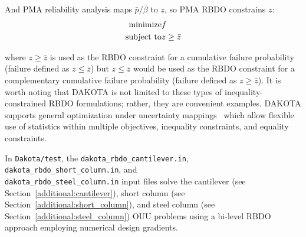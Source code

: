 \noindent And PMA reliability analysis maps $\bar{p}/\bar{\beta}$ to 
$z$, so PMA RBDO constrains $z$:
\begin{eqnarray}
  {\rm minimize }     & f \nonumber \\
  {\rm subject \ to } & z \ge \bar{z} \label{eq:rbdo_pma}
\end{eqnarray}

\noindent where $z \ge \bar{z}$ is used as the RBDO constraint for 
a cumulative failure probability (failure defined as $z \le \bar{z}$)
but $z \le \bar{z}$ would be used as the RBDO constraint for a
complementary cumulative failure probability (failure defined as $z
\ge \bar{z}$).  It is worth noting that DAKOTA is not limited to these
types of inequality-constrained RBDO formulations; rather, they are
convenient examples.  DAKOTA supports general optimization under
uncertainty mappings~\cite{Eld02} which allow flexible use of
statistics within multiple objectives, inequality constraints, and
equality constraints.

In \texttt{Dakota/test}, the \texttt{dakota\_rbdo\_cantilever.in},
\texttt{dakota\_rbdo\_short\_column.in}, and\\
\texttt{dakota\_rbdo\_steel\_column.in} input files solve 
the cantilever (see Section~\ref{additional:cantilever}), short column
(see Section~\ref{additional:short_column}), and steel column (see
Section~\ref{additional:steel_column}) OUU problems using a bi-level
RBDO approach employing numerical design gradients.


